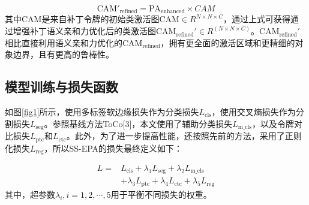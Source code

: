 \begin{equation}
\text{CAM}'_\text{refined} = \text{PA}_\text{enhanced} \times CAM
\end{equation}
其中$\text{CAM}$是来自补丁令牌的初始类激活图$\text{CAM}\in R^{N\times N\times C}$，通过上式可获得通过增强补丁语义亲和力优化后的类激活图$\text{CAM}_\text{refined}'\in R^(N\times N\times C)$。$\text{CAM}_\text{refined}'$相比直接利用语义亲和力优化的$\text{CAM}_\text{refined}$，拥有更全面的激活区域和更精细的对象边界，且有更高的鲁棒性。

\vspace{2mm}
\begin{CJK*}{UTF8}{zhhei}
    \subsection{模型训练与损失函数}
\end{CJK*}

如图\ref{fig1}所示，使用多标签软边缘损失作为分类损失$L_\text{cls}$，使用交叉熵损失作为分割损失$L_\text{seg}$。参照基线方法ToCo[3]，本文使用了辅助分类损失$L_\text{m\_cls}$，以及令牌对比损失$L_\text{ptc}$和$L_\text{ctc}$。此外，为了进一步提高性能，还按照先前的方法\cite{13ru2022learning,15tang2018regularized,16zhang2021dynamic,17zhang2020reliability}，采用了正则化损失$L_\text{reg}$，所以SS-EPA的损失最终定义如下：

\begin{equation}
    \begin{aligned}
        L=&L_\text{cls}+\lambda_1 L_\text{seg}+\lambda_2 L_\text{m\_cls}\\
        &+\lambda_3 L_\text{ptc}+ \lambda_4 L_\text{ctc}+ \lambda_5 L_\text{reg}
    \label{equation_8}
    \end{aligned}
\end{equation}
其中，超参数$\lambda_i,i=1,2,\cdots,5$用于平衡不同损失的权重。
